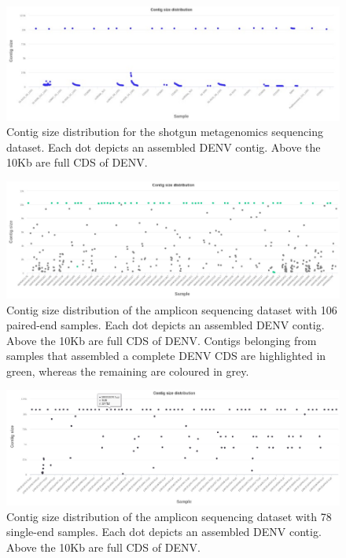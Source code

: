 \begin{figure}[h!]
\centering
\includegraphics[width=\textwidth]{figures/chapter 4/Figure S2.pdf}
\caption{Contig size distribution for the shotgun metagenomics sequencing dataset. Each dot depicts an assembled DENV contig.  Above the 10Kb are full CDS of DENV.}
\label{fig:chap4_figure_sup2}
\end{figure}

\begin{figure}[h!]
\centering
\includegraphics[width=\textwidth]{figures/chapter 4/Figure S3.pdf}
\caption{Contig size distribution of the amplicon sequencing dataset with 106 paired-end samples. Each dot depicts an assembled DENV contig. Above the 10Kb are full CDS of DENV. Contigs belonging from samples that assembled a complete DENV CDS are highlighted in green, whereas the remaining are coloured in grey.}
\label{fig:chap4_figure_sup3}
\end{figure}

\begin{figure}[h!]
\centering
\includegraphics[width=\textwidth]{figures/chapter 4/Figure S4.pdf}
\caption{Contig size distribution of the amplicon sequencing dataset with 78 single-end samples. Each dot depicts an assembled DENV contig. Above the 10Kb are full CDS of DENV.}
\label{fig:chap4_figure_sup4}
\end{figure}

